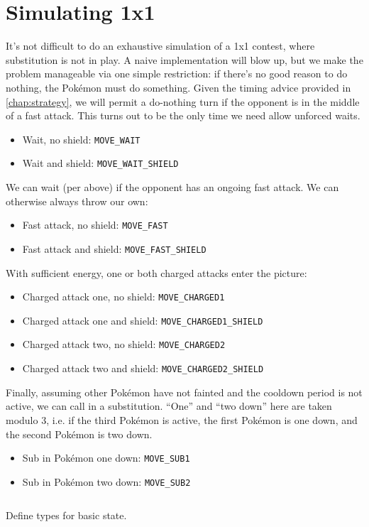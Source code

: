 \section{Simulating 1x1}
\label{sec:simul1x1}
It's not difficult to do an exhaustive simulation of a 1x1 contest,
 where substitution is not in play.
A naive implementation will blow up, but we make the problem manageable
 via one simple restriction: if there's no good reason to do nothing,
 the Pokémon must do something.
Given the timing advice provided in \autoref{chap:strategy}, we will permit
 a do-nothing turn if the opponent is in the middle of a fast attack.
This turns out to be the only time we need allow unforced waits.
\begin{itemize}
\item Wait, no shield: \texttt{MOVE\_WAIT}
\item Wait and shield: \texttt{MOVE\_WAIT\_SHIELD}
\end{itemize}
We can wait (per above) if the opponent has an ongoing fast attack.
We can otherwise always throw our own:
\begin{itemize}
\item Fast attack, no shield: \texttt{MOVE\_FAST}
\item Fast attack and shield: \texttt{MOVE\_FAST\_SHIELD}
\end{itemize}
With sufficient energy, one or both charged attacks enter the picture:
\begin{itemize}
\item Charged attack one, no shield: \texttt{MOVE\_CHARGED1}
\item Charged attack one and shield: \texttt{MOVE\_CHARGED1\_SHIELD}
\item Charged attack two, no shield: \texttt{MOVE\_CHARGED2}
\item Charged attack two and shield: \texttt{MOVE\_CHARGED2\_SHIELD}
\end{itemize}
Finally, assuming other Pokémon have not fainted and the cooldown period is not active,
 we can call in a substitution.
``One'' and ``two down'' here are taken modulo 3,
 i.e. if the third Pokémon is active, the first Pokémon is one down,
 and the second Pokémon is two down.
\begin{itemize}
\item Sub in Pokémon one down: \texttt{MOVE\_SUB1}
\item Sub in Pokémon two down: \texttt{MOVE\_SUB2}
\end{itemize}
\inputminted{cpp}{s/moves.h}
Define types for basic state.

